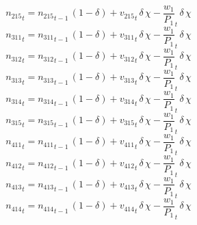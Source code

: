 \begin{dmath}
{{n_{215}}}_{t}={{n_{215}}}_{t-1}\, \left(1-{{\delta}}\right)+{{v_{215}}}_{t}\, {{\delta}}\, {{\chi}}-{{\frac{w_{1}}{P_{1}}}}_{t}\, {{\delta}}\, {{\chi}}
\end{dmath}
\begin{dmath}
{{n_{311}}}_{t}={{n_{311}}}_{t-1}\, \left(1-{{\delta}}\right)+{{v_{311}}}_{t}\, {{\delta}}\, {{\chi}}-{{\frac{w_{1}}{P_{1}}}}_{t}\, {{\delta}}\, {{\chi}}
\end{dmath}
\begin{dmath}
{{n_{312}}}_{t}={{n_{312}}}_{t-1}\, \left(1-{{\delta}}\right)+{{v_{312}}}_{t}\, {{\delta}}\, {{\chi}}-{{\frac{w_{1}}{P_{1}}}}_{t}\, {{\delta}}\, {{\chi}}
\end{dmath}
\begin{dmath}
{{n_{313}}}_{t}={{n_{313}}}_{t-1}\, \left(1-{{\delta}}\right)+{{v_{313}}}_{t}\, {{\delta}}\, {{\chi}}-{{\frac{w_{1}}{P_{1}}}}_{t}\, {{\delta}}\, {{\chi}}
\end{dmath}
\begin{dmath}
{{n_{314}}}_{t}={{n_{314}}}_{t-1}\, \left(1-{{\delta}}\right)+{{v_{314}}}_{t}\, {{\delta}}\, {{\chi}}-{{\frac{w_{1}}{P_{1}}}}_{t}\, {{\delta}}\, {{\chi}}
\end{dmath}
\begin{dmath}
{{n_{315}}}_{t}={{n_{315}}}_{t-1}\, \left(1-{{\delta}}\right)+{{v_{315}}}_{t}\, {{\delta}}\, {{\chi}}-{{\frac{w_{1}}{P_{1}}}}_{t}\, {{\delta}}\, {{\chi}}
\end{dmath}
\begin{dmath}
{{n_{411}}}_{t}={{n_{411}}}_{t-1}\, \left(1-{{\delta}}\right)+{{v_{411}}}_{t}\, {{\delta}}\, {{\chi}}-{{\frac{w_{1}}{P_{1}}}}_{t}\, {{\delta}}\, {{\chi}}
\end{dmath}
\begin{dmath}
{{n_{412}}}_{t}={{n_{412}}}_{t-1}\, \left(1-{{\delta}}\right)+{{v_{412}}}_{t}\, {{\delta}}\, {{\chi}}-{{\frac{w_{1}}{P_{1}}}}_{t}\, {{\delta}}\, {{\chi}}
\end{dmath}
\begin{dmath}
{{n_{413}}}_{t}={{n_{413}}}_{t-1}\, \left(1-{{\delta}}\right)+{{v_{413}}}_{t}\, {{\delta}}\, {{\chi}}-{{\frac{w_{1}}{P_{1}}}}_{t}\, {{\delta}}\, {{\chi}}
\end{dmath}
\begin{dmath}
{{n_{414}}}_{t}={{n_{414}}}_{t-1}\, \left(1-{{\delta}}\right)+{{v_{414}}}_{t}\, {{\delta}}\, {{\chi}}-{{\frac{w_{1}}{P_{1}}}}_{t}\, {{\delta}}\, {{\chi}}
\end{dmath}
